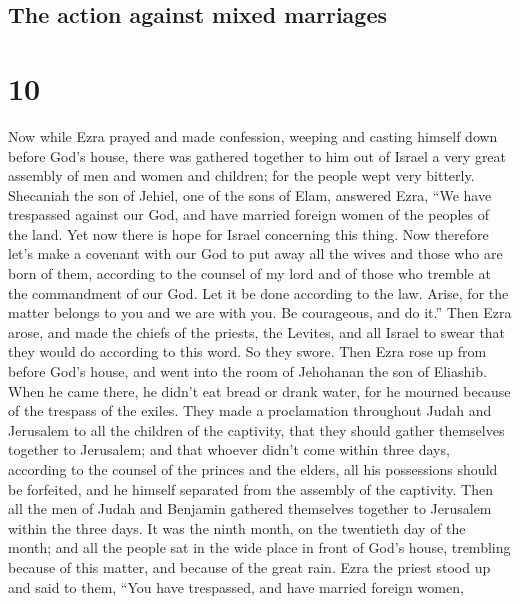 \hypertarget{the-action-against-mixed-marriages}{%
\subsection{The action against mixed
marriages}\label{the-action-against-mixed-marriages}}

\hypertarget{section-9}{%
\section{10}\label{section-9}}

 Now while Ezra prayed and made confession, weeping and
casting himself down before God's house, there was gathered together to
him out of Israel a very great assembly of men and women and children;
for the people wept very bitterly.  Shecaniah the son of
Jehiel, one of the sons of Elam, answered Ezra, ``We have trespassed
against our God, and have married foreign women of the peoples of the
land. Yet now there is hope for Israel concerning this thing.
 Now therefore let's make a covenant with our God to put
away all the wives and those who are born of them, according to the
counsel of my lord and of those who tremble at the commandment of our
God. Let it be done according to the law.  Arise, for the
matter belongs to you and we are with you. Be courageous, and do it.''
 Then Ezra arose, and made the chiefs of the priests, the
Levites, and all Israel to swear that they would do according to this
word. So they swore.  Then Ezra rose up from before God's
house, and went into the room of Jehohanan the son of Eliashib. When he
came there, he didn't eat bread or drank water, for he mourned because
of the trespass of the exiles.  They made a proclamation
throughout Judah and Jerusalem to all the children of the captivity,
that they should gather themselves together to Jerusalem; 
and that whoever didn't come within three days, according to the counsel
of the princes and the elders, all his possessions should be forfeited,
and he himself separated from the assembly of the captivity.
 Then all the men of Judah and Benjamin gathered
themselves together to Jerusalem within the three days. It was the ninth
month, on the twentieth day of the month; and all the people sat in the
wide place in front of God's house, trembling because of this matter,
and because of the great rain.  Ezra the priest stood up
and said to them, ``You have trespassed, and have married foreign women,

